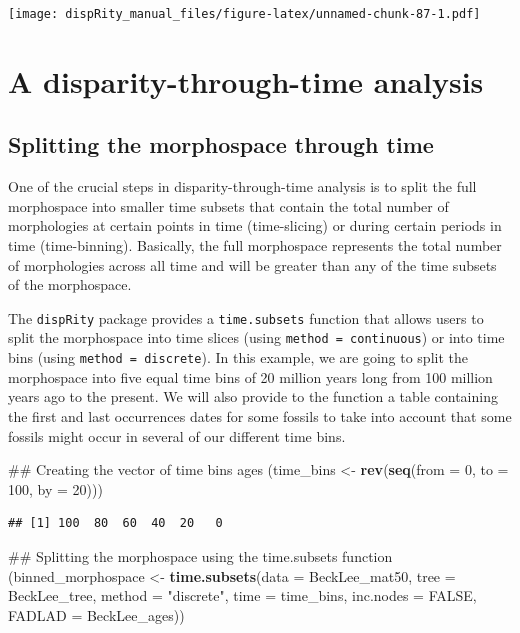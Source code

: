\documentclass[]{book}
\newenvironment{Shaded}{\begin{snugshade}}{\end{snugshade}}
\newcommand{\KeywordTok}[1]{\textcolor[rgb]{0.13,0.29,0.53}{\textbf{#1}}}
\newcommand{\DataTypeTok}[1]{\textcolor[rgb]{0.13,0.29,0.53}{#1}}
\newcommand{\DecValTok}[1]{\textcolor[rgb]{0.00,0.00,0.81}{#1}}
\newcommand{\StringTok}[1]{\textcolor[rgb]{0.31,0.60,0.02}{#1}}
\newcommand{\OtherTok}[1]{\textcolor[rgb]{0.56,0.35,0.01}{#1}}
\newcommand{\NormalTok}[1]{#1}
\theoremstyle{definition}
\theoremstyle{definition}
\theoremstyle{remark}
\begin{document}
\texttt{[image: dispRity\_manual\_files/figure-latex/unnamed-chunk-87-1.pdf]}

\section{A disparity-through-time
analysis}\label{a-disparity-through-time-analysis}

\subsection{Splitting the morphospace through
time}\label{splitting-the-morphospace-through-time}

One of the crucial steps in disparity-through-time analysis is to split
the full morphospace into smaller time subsets that contain the total
number of morphologies at certain points in time (time-slicing) or
during certain periods in time (time-binning). Basically, the full
morphospace represents the total number of morphologies across all time
and will be greater than any of the time subsets of the morphospace.

The \texttt{dispRity} package provides a \texttt{time.subsets} function
that allows users to split the morphospace into time slices (using
\texttt{method\ =\ continuous}) or into time bins (using
\texttt{method\ =\ discrete}). In this example, we are going to split
the morphospace into five equal time bins of 20 million years long from
100 million years ago to the present. We will also provide to the
function a table containing the first and last occurrences dates for
some fossils to take into account that some fossils might occur in
several of our different time bins.

\begin{Shaded}
\begin{Highlighting}[]
\NormalTok{## Creating the vector of time bins ages}
\NormalTok{(time_bins <-}\StringTok{ }\KeywordTok{rev}\NormalTok{(}\KeywordTok{seq}\NormalTok{(}\DataTypeTok{from =} \DecValTok{0}\NormalTok{, }\DataTypeTok{to =} \DecValTok{100}\NormalTok{, }\DataTypeTok{by =} \DecValTok{20}\NormalTok{)))}
\end{Highlighting}
\end{Shaded}

\begin{verbatim}
## [1] 100  80  60  40  20   0
\end{verbatim}

\begin{Shaded}
\begin{Highlighting}[]
\NormalTok{## Splitting the morphospace using the time.subsets function}
\NormalTok{(binned_morphospace <-}\StringTok{ }\KeywordTok{time.subsets}\NormalTok{(}\DataTypeTok{data =}\NormalTok{ BeckLee_mat50, }\DataTypeTok{tree =}\NormalTok{ BeckLee_tree,}
    \DataTypeTok{method =} \StringTok{"discrete"}\NormalTok{, }\DataTypeTok{time =}\NormalTok{ time_bins, }\DataTypeTok{inc.nodes =} \OtherTok{FALSE}\NormalTok{,}
    \DataTypeTok{FADLAD =}\NormalTok{ BeckLee_ages))}
\end{Highlighting}
\end{Shaded}
\end{document}
